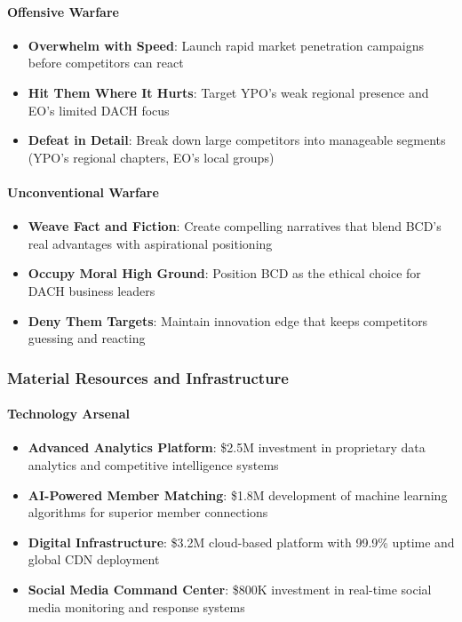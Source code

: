 \paragraph{Offensive Warfare}
\begin{itemize}
    \item \textbf{Overwhelm with Speed}: Launch rapid market penetration campaigns before competitors can react
    \item \textbf{Hit Them Where It Hurts}: Target YPO's weak regional presence and EO's limited DACH focus
    \item \textbf{Defeat in Detail}: Break down large competitors into manageable segments (YPO's regional chapters, EO's local groups)
\end{itemize}

\paragraph{Unconventional Warfare}
\begin{itemize}
    \item \textbf{Weave Fact and Fiction}: Create compelling narratives that blend BCD's real advantages with aspirational positioning
    \item \textbf{Occupy Moral High Ground}: Position BCD as the ethical choice for DACH business leaders
    \item \textbf{Deny Them Targets}: Maintain innovation edge that keeps competitors guessing and reacting
\end{itemize}

\subsubsection{Material Resources and Infrastructure}

\paragraph{Technology Arsenal}
\begin{itemize}
    \item \textbf{Advanced Analytics Platform}: \$2.5M investment in proprietary data analytics and competitive intelligence systems
    \item \textbf{AI-Powered Member Matching}: \$1.8M development of machine learning algorithms for superior member connections
    \item \textbf{Digital Infrastructure}: \$3.2M cloud-based platform with 99.9\% uptime and global CDN deployment
    \item \textbf{Social Media Command Center}: \$800K investment in real-time social media monitoring and response systems
\end{itemize}

